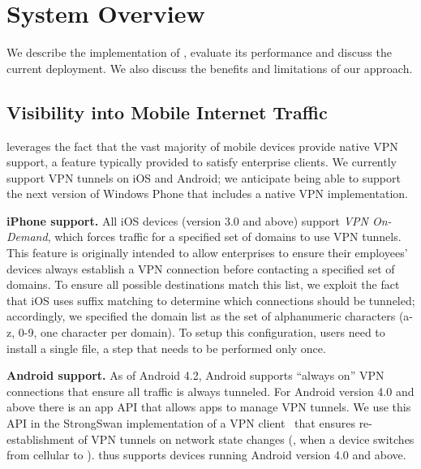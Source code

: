 %

\section{System Overview}
\label{sec:impl}
We describe the implementation of \meddle, evaluate its performance and discuss 
the current deployment. We also discuss the benefits and limitations of our approach.

\subsection{Visibility into Mobile Internet Traffic}
\label{subsec:design_visibility}

\meddle leverages the fact that the vast majority of mobile devices provide native VPN support, a feature typically provided to satisfy enterprise clients. We currently support VPN tunnels on iOS and Android; we anticipate being able to support the next version of Windows Phone that includes a native VPN implementation.

\noindent\textbf{iPhone support.} 
All iOS devices (version 3.0 and above) support \textit{VPN On-Demand}, which forces traffic for a specified set of domains to use VPN tunnels. 
This feature is originally intended to allow enterprises to ensure their employees' devices always establish a VPN connection before contacting a specified set of domains. 
To ensure all possible destinations match this list, we exploit the fact that iOS uses suffix matching to determine which connections should be tunneled; accordingly, we specified the domain list as the set of alphanumeric characters (a-z, 0-9, one character per domain). 
To setup this configuration, users need to install a single file, a step that needs to be performed only once. 

\noindent\textbf{Android support.} As of Android 4.2, Android supports ``always on'' VPN connections that ensure all traffic is always tunneled.
For Android version 4.0 and above there is an app API that allows apps to manage VPN tunnels. 
We use this API in the StrongSwan implementation of a VPN client~\cite{strongswanclient} that ensures re-establishment of VPN tunnels on network state changes (\eg, when a device switches from cellular to \wifi).
\meddle thus supports devices running Android version 4.0 and above.

